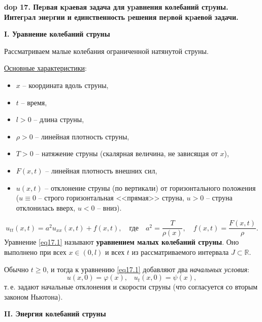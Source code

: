 \textbf{\LARGE dop 17.  Пеpвая кpаевая задача для уpавнения колебаний стpуны. Интегpал энеpгии и единственность pешения пеpвой кpаевой задачи.}
\renewcommand{\theequation}{\arabic{equation}} 
\setcounter{equation}{0}

\textbf{\quad I. Уравнение колебаний струны}

\noindent Рассматриваем малые колебания ограниченной натянутой струны.

\noindent\underline{Основные характеристики}:
\begin{itemize}
    \item $x$ -- координата вдоль струны,
    \item $t$ -- время,
    \item $l>0$ -- длина струны,
    \item $\rho>0$ -- линейная плотность струны,
    \item $T>0$ -- натяжение струны (скалярная величина, не зависящая от $x$),
    \item $F(x, t)$ -- линейная плотность внешних сил,
    \item $u(x, t)$ -- отклонение струны (по вертикали) от горизонтального положения ($u \equiv 0$ -- строго горизонтальная <<прямая>> струна, \;$u>0$ -- струна отклонилась вверх, \;$u<0$ -- вниз).
\end{itemize}

\begin{equation}
    u_{tt}(x, t) = a^2 u_{xx}(x, t) + f(x, t), \quad\text{где}\quad a^2 = \frac{T}{\rho(x)}, \quad f(x, t) = \frac{F(x, t)}{\rho}. \label{eq17.1}
\end{equation}
\noindent Уравнение \eqref{eq17.1} называют \textbf{уравнением малых колебаний струны}. Оно выполнено при всех $x \in (0, l)$ и всех $t$ из рассматриваемого интервала $J \subset \mathbb{R}$. 

Обычно $t \geq 0$, и тогда к уравнению \eqref{eq17.1} добавляют два \textit{начальных условия}: $$u(x, 0) = \varphi(x),\;\;\; u_t(x, 0) = \psi(x),$$ т.\,е. задают начальные отклонения и скорости струны (что согласуется со вторым законом Ньютона).

\textbf{\quad II. Энергия колебаний струны}

